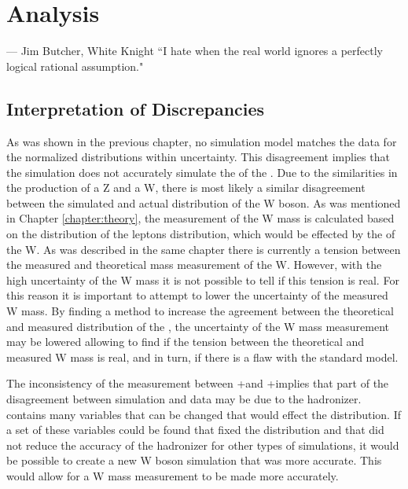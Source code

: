 \chapter{Analysis}
\label{Chapter:analysis}

\begin{chapquote}{--- \textup{Jim Butcher}, White Knight}
``I hate when the real world ignores a perfectly logical rational assumption."
\end{chapquote}



\section{Interpretation of Discrepancies}
As was shown in the previous chapter, no simulation model matches the data for the normalized distributions within uncertainty. This disagreement implies that the simulation does not accurately simulate the \bosonpt of the \Z. Due to the similarities in the production of a Z and a W, there is most likely a similar disagreement between the simulated and actual \bosonpt distribution of the W boson. As was mentioned in Chapter \ref{chapter:theory}, the measurement of the W mass is calculated based on the distribution of the leptons \pt distribution, which would be effected by the \bosonpt of the W. As was described in  the same chapter there is currently a tension between the measured and theoretical mass measurement of the W. However, with the high uncertainty of the W mass it is not possible to tell if this tension is real. For this reason it is important to attempt to lower the uncertainty of the measured W mass.  By finding a method to increase the agreement between the theoretical and measured \phistar distribution of the \Z, the uncertainty of the W mass measurement may be lowered allowing to find if the tension between the theoretical and measured W mass is real, and in turn, if there is a flaw with the standard model.

The inconsistency of the \phistar measurement between \POWHEG+\PYTHIAsix and \POWHEG+\PYTHIAeight implies that part of the disagreement between simulation and data may be due to the hadronizer. \PYTHIAeight contains many variables that can be changed that would effect the \phistar distribution. If a set of these variables could be found that fixed the \phistar distribution and that did not reduce the accuracy of the hadronizer for other types of simulations, it would be possible to create a new W boson simulation that was more accurate. This would allow for a W mass measurement to be made more accurately.


